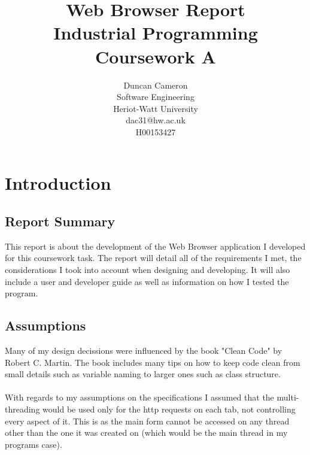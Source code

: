 \documentclass[11pt]{report}
\begin{document}

\newcommand{\plan}[1]{\textcolor{blue}{- \textit{#1}\\}}



\newenvironment{checklist}{%
  \begin{list}{}{}%
  \let\olditem\item
  \renewcommand\item{\olditem -- \marginpar{$\Box$} }
  \newcommand\checkeditem{\olditem -- \marginpar{$\CheckedBox$} }
}{%
  \end{list}
}   

\lstset{language=[Sharp]C}

\title{Web Browser Report\\ Industrial Programming Coursework A}
\author{Duncan Cameron \\
Software Engineering \\
Heriot-Watt University \\
dac31@hw.ac.uk\\
H00153427}
\maketitle

\newpage
\tableofcontents
\chapter{Introduction}

\section{Report Summary}
This report is about the development of the Web Browser application I developed for this coursework task.  The report will detail all of the requirements I met, the considerations I took into account when designing and developing.  It will also include a user and developer guide as well as information on how I tested the program.

\section{Assumptions}
Many of my design decissions were influenced by the book "Clean Code" by Robert C. Martin. The book includes many tips on how to keep code clean from small details such as variable naming to larger ones such as class structure.\\\\
With regards to my assumptions on the specifications I assumed that the multi-threading would be used only for the http requests on each tab, not controlling every aspect of it.  This is as the main form cannot be accessed on any thread other than the one it was created on (which would be the main thread in my programs case).
\end{document}
